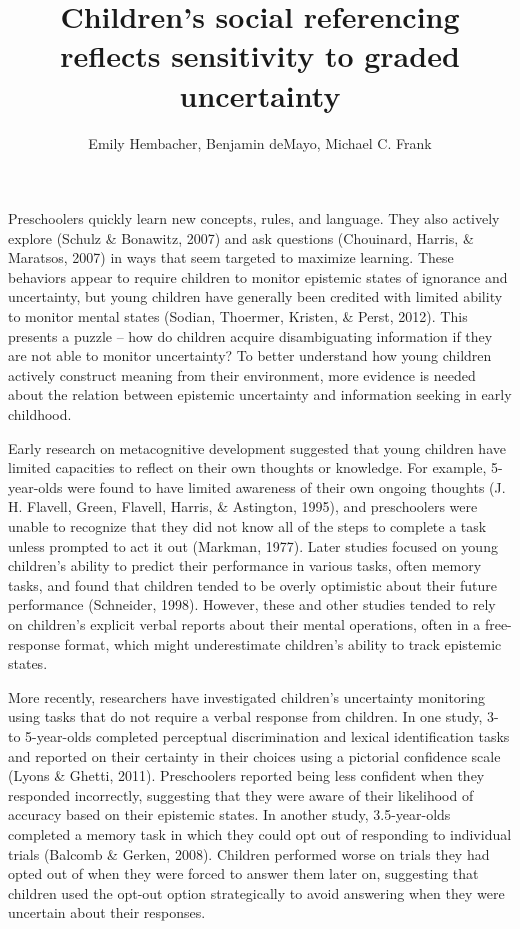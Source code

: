 \documentclass[a4paper,man,apacite,floatsintext]{apa6}
\date{}
\title{\textbf{Children's social referencing reflects sensitivity to graded uncertainty}}
\author{Emily Hembacher, Benjamin deMayo, Michael C. Frank}
\affiliation{Department of Psychology, Stanford University}
\begin{document}
\maketitle

Preschoolers quickly learn new concepts, rules, and language. They also
actively explore (Schulz \& Bonawitz, 2007) and ask questions
(Chouinard, Harris, \& Maratsos, 2007) in ways that seem targeted to
maximize learning. These behaviors appear to require children to monitor
epistemic states of ignorance and uncertainty, but young children have
generally been credited with limited ability to monitor mental states
(Sodian, Thoermer, Kristen, \& Perst, 2012). This presents a puzzle --
how do children acquire disambiguating information if they are not able
to monitor uncertainty? To better understand how young children actively
construct meaning from their environment, more evidence is needed about
the relation between epistemic uncertainty and information seeking in
early childhood.

Early research on metacognitive development suggested that young
children have limited capacities to reflect on their own thoughts or
knowledge. For example, 5-year-olds were found to have limited awareness
of their own ongoing thoughts (J. H. Flavell, Green, Flavell, Harris, \&
Astington, 1995), and preschoolers were unable to recognize that they
did not know all of the steps to complete a task unless prompted to act
it out (Markman, 1977). Later studies focused on young children's
ability to predict their performance in various tasks, often memory
tasks, and found that children tended to be overly optimistic about
their future performance (Schneider, 1998). However, these and other
studies tended to rely on children's explicit verbal reports about their
mental operations, often in a free-response format, which might
underestimate children's ability to track epistemic states.

More recently, researchers have investigated children's uncertainty
monitoring using tasks that do not require a verbal response from
children. In one study, 3- to 5-year-olds completed perceptual
discrimination and lexical identification tasks and reported on their
certainty in their choices using a pictorial confidence scale (Lyons \&
Ghetti, 2011). Preschoolers reported being less confident when they
responded incorrectly, suggesting that they were aware of their
likelihood of accuracy based on their epistemic states. In another
study, 3.5-year-olds completed a memory task in which they could opt out
of responding to individual trials (Balcomb \& Gerken, 2008). Children
performed worse on trials they had opted out of when they were forced to
answer them later on, suggesting that children used the opt-out option
strategically to avoid answering when they were uncertain about their
responses.
\end{document}
